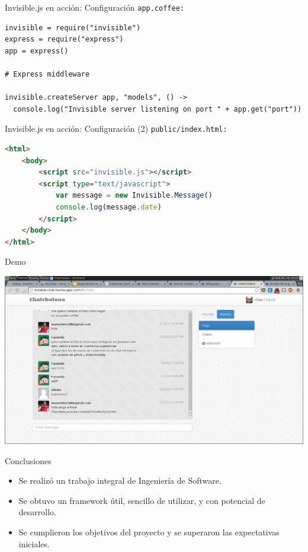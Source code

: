 \documentclass[xcolor=dvipsnames, 14pt]{beamer}
\begin{document}
\begin{frame}[fragile]{Invisible.js en acción: Configuración}
\texttt{app.coffee:}
\begin{lstlisting}
invisible = require("invisible")
express = require("express")
app = express()

# Express middleware

invisible.createServer app, "models", () ->
  console.log("Invisible server listening on port " + app.get("port"))
\end{lstlisting}
\end{frame}

\begin{frame}[fragile]{Invisible.js en acción: Configuración (2)}
\texttt{public/index.html:}
\begin{lstlisting}[language=html]
<html>
    <body>
        <script src="invisible.js"></script>
        <script type="text/javascript">
            var message = new Invisible.Message()
            console.log(message.date)
        </script>
    </body>
</html>
\end{lstlisting}
\end{frame}

\begin{frame}{Demo}
    \begin{center}
        \includegraphics[width=\textwidth]{img/demo.png}
    \end{center}
\end{frame}

\begin{frame}{Conclusiones}
\begin{itemize}
    \item Se realizó un trabajo integral de Ingeniería de Software.
    \item Se obtuvo un framework útil, sencillo de utilizar, y con potencial de desarrollo.
    \item Se cumplieron los objetivos del proyecto y se superaron las expectativas iniciales.
\end{itemize}
\end{frame}
\end{document}
